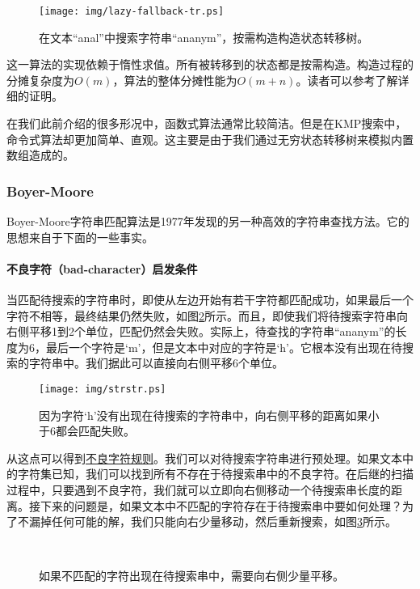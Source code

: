 \documentclass[UTF8]{article}
\begin{document}
\begin{figure}[htbp]
 \centering
 \texttt{[image: img/lazy-fallback-tr.ps]}
 \caption{在文本“anal”中搜索字符串“ananym”，按需构造构造状态转移树。}
 \label{fig:lazy-fallback-tree}
\end{figure}

这一算法的实现依赖于惰性求值。所有被转移到的状态都是按需构造。构造过程的分摊复杂度为$O(m)$，算法的整体分摊性能为$O(m+n)$。读者可以参考\cite{fp-pearls}了解详细的证明。

在我们此前介绍的很多形况中，函数式算法通常比较简洁。但是在KMP搜索中，命令式算法却更加简单、直观。这主要是由于我们通过无穷状态转移树来模拟内置数组造成的。

\subsubsection{Boyer-Moore}

Boyer-Moore字符串匹配算法是1977年发现的另一种高效的字符串查找方法\cite{boyer-moore}。它的思想来自于下面的一些事实。

\paragraph{不良字符（bad-character）启发条件}

当匹配待搜索的字符串时，即使从左边开始有若干字符都匹配成功，如果最后一个字符不相等，最终结果仍然失败，如图\ref{fig:bad-char}所示。而且，即使我们将待搜索字符串向右侧平移1到2个单位，匹配仍然会失败。实际上，待查找的字符串“ananym”的长度为6，最后一个字符是‘m’，但是文本中对应的字符是‘h’。它根本没有出现在待搜索的字符串中。我们据此可以直接向右侧平移6个单位。

\begin{figure}[htbp]
 \centering
 \texttt{[image: img/strstr.ps]}
 \caption{因为字符‘h’没有出现在待搜索的字符串中，向右侧平移的距离如果小于6都会匹配失败。}
 \label{fig:bad-char}
\end{figure}

从这点可以得到\underline{不良字符规则}。我们可以对待搜索字符串进行预处理。如果文本中的字符集已知，我们可以找到所有不存在于待搜索串中的不良字符。在后继的扫描过程中，只要遇到不良字符，我们就可以立即向右侧移动一个待搜索串长度的距离。接下来的问题是，如果文本中不匹配的字符存在于待搜索串中要如何处理？为了不漏掉任何可能的解，我们只能向右少量移动，然后重新搜索，如图\ref{fig:good-char}所示。

\begin{figure}[htbp]
 \centering
  \\
 \caption{如果不匹配的字符出现在待搜索串中，需要向右侧少量平移。}
 \label{fig:good-char}
\end{figure}
\end{document}

